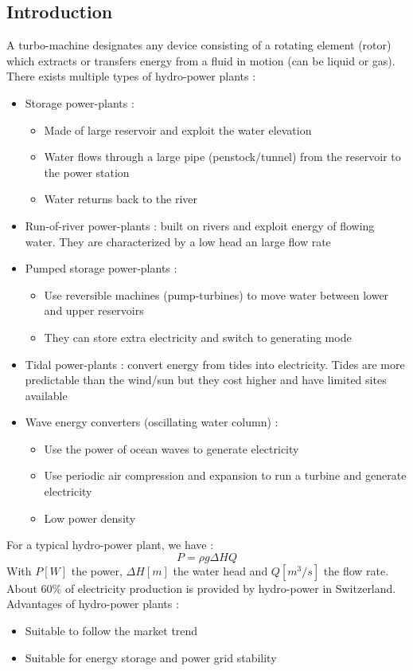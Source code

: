 \documentclass[../main.tex]{subfiles}
\begin{document}
\localtableofcontents
\subsection{Introduction}
A turbo-machine designates any device consisting of a rotating element (rotor) which extracts or transfers energy from a fluid in motion (can be liquid or gas).\\
There exists multiple types of hydro-power plants : \begin{itemize}
    \item Storage power-plants : \begin{itemize}
        \item Made of large reservoir and exploit the water elevation
        \item Water flows through a large pipe (penstock/tunnel) from the reservoir to the power station
        \item Water returns back to the river
    \end{itemize}
    \item Run-of-river power-plants : built on rivers and exploit energy of flowing water. They are characterized by a low head an large flow rate
    \item Pumped storage power-plants : \begin{itemize}
        \item Use reversible machines (pump-turbines) to move water between lower and upper reservoirs
        \item They can store extra electricity and switch to generating mode
    \end{itemize}
    \item Tidal power-plants : convert energy from tides into electricity. Tides are more predictable than the wind/sun but they cost higher and have limited sites available
    \item Wave energy converters (oscillating water column) : \begin{itemize}
        \item Use the power of ocean waves to generate electricity
        \item Use periodic air compression and expansion to run a turbine and generate electricity
        \item Low power density
    \end{itemize}
\end{itemize}
For a typical hydro-power plant, we have :\begin{equation}
    P = \rho g \Delta H Q
\end{equation}
With $P [W]$ the power, $\Delta H [m]$ the water head and $Q [m^3/s]$ the flow rate.\\
About $60\%$ of electricity production is provided by hydro-power in Switzerland.\\
Advantages of hydro-power plants : \begin{itemize}
    \item Suitable to follow the market trend
    \item Suitable for energy storage and power grid stability
\end{itemize}
\end{document}
